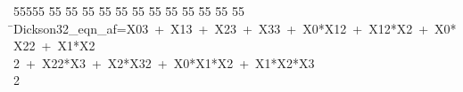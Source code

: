%
%
\begin{tabbing}
55555 \= 55 \= 55 \= 55 \= 55 \= 55 \= 55 \= 55 \= 55 \= 55 \= 55 \= 55 \= 55 \= \>Dickson32\_eqn\_af=X03\ +\ X13\ +\ X23\ +\ X33\ +\ X0*X12\ +\ X12*X2\ +\ X0*X22\ +\ X1*X2\\[0pt]
\>2\ +\ X22*X3\ +\ X2*X32\ +\ X0*X1*X2\ +\ X1*X2*X3\\[0pt]
2\>\end{tabbing}
